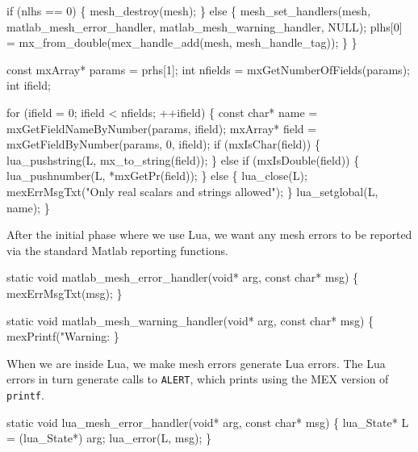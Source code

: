     if (nlhs == 0) \{
        mesh_destroy(mesh);
    \} else \{
        mesh_set_handlers(mesh, matlab_mesh_error_handler, 
                          matlab_mesh_warning_handler, NULL);
        plhs[0] = mx_from_double(mex_handle_add(mesh, mesh_handle_tag));
    \}
\}

\nwendcode{}\nwdocspar

\nwenddocs{}\endmoddef
const mxArray* params = prhs[1];
int nfields = mxGetNumberOfFields(params);
int ifield;

for (ifield = 0; ifield < nfields; ++ifield) \{
    const char* name = mxGetFieldNameByNumber(params, ifield);
    mxArray* field = mxGetFieldByNumber(params, 0, ifield);
    if (mxIsChar(field)) \{
        lua_pushstring(L, mx_to_string(field));
    \} else if (mxIsDouble(field)) \{
        lua_pushnumber(L, *mxGetPr(field));
    \} else \{
        lua_close(L);
        mexErrMsgTxt("Only real scalars and strings allowed");
    \}
    lua_setglobal(L, name);
\}

\nwendcode{}\nwdocspar

After the initial phase where we use Lua, we want any mesh errors
to be reported via the standard Matlab reporting functions.

\nwenddocs{}\endmoddef
static void matlab_mesh_error_handler(void* arg, const char* msg)
\{
    mexErrMsgTxt(msg);
\}

static void matlab_mesh_warning_handler(void* arg, const char* msg)
\{
    mexPrintf("Warning: %
\}

\nwendcode{}\nwdocspar

When we are inside Lua, we make mesh errors generate Lua errors.
The Lua errors in turn generate calls to {\tt{}{}ALERT}, which prints
using the MEX version of {\tt{}printf}.

\nwenddocs{}\plusendmoddef
static void lua_mesh_error_handler(void* arg, const char* msg)
\{
    lua_State* L = (lua_State*) arg;
    lua_error(L, msg);
\}

